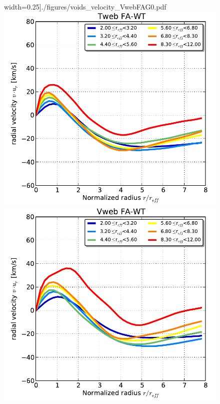 \documentclass[a4,useAMS,usenatbib,usegraphicx]{latex/mn2e}
\begin{document}
\begin{flushleft}
\begin{figure}
  width=0.25\textheight]{./figures/voids_velocity_VwebFAG0.pdf}
  \includegraphics[trim = 1mm 2mm 4mm 0mm, clip, keepaspectratio=true,
  width=0.25\textheight]{./figures/voids_velocity_TwebFAG1.pdf}
  \includegraphics[trim = 1mm 2mm 4mm 0mm, clip, keepaspectratio=true,
  width=0.25\textheight]{./figures/voids_velocity_VwebFAG1.pdf}


  \label{fig:RhoVel}
  \vspace{0.1 cm}

\end{figure}
\end{flushleft}
\end{document}

